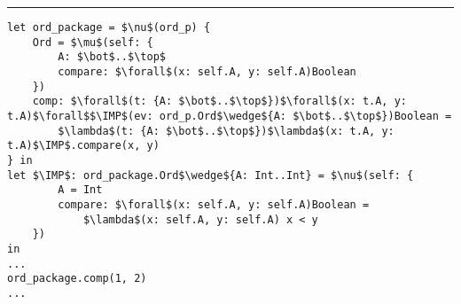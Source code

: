 \hrule

\begin{minipage}{\textwidth}
\begin{lstlisting}[mathescape]
let ord_package = $\nu$(ord_p) {
    Ord = $\mu$(self: {
        A: $\bot$..$\top$
        compare: $\forall$(x: self.A, y: self.A)Boolean
    })
    comp: $\forall$(t: {A: $\bot$..$\top$})$\forall$(x: t.A, y: t.A)$\forall$$\IMP$(ev: ord_p.Ord$\wedge${A: $\bot$..$\top$})Boolean =
        $\lambda$(t: {A: $\bot$..$\top$})$\lambda$(x: t.A, y: t.A)$\IMP$.compare(x, y)
} in
let $\IMP$: ord_package.Ord$\wedge${A: Int..Int} = $\nu$(self: {
        A = Int
        compare: $\forall$(x: self.A, y: self.A)Boolean =
            $\lambda$(x: self.A, y: self.A) x < y
    })
in
...
ord_package.comp(1, 2)
...
\end{lstlisting}
\end{minipage}
